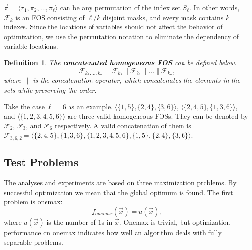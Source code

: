 \documentclass{sig-alternate}
\newtheorem{definition}{Definition}
\begin{document}
$\vec{\pi} = \langle\pi_1, \pi_2, \dots, \pi_\ell\rangle$ can be any permutation of the index set $S_\ell$.
In other words, ${\mathcal F}_k$ is an FOS consisting of $\ell/k$ disjoint masks, and every mask contains $k$ indexes.
Since the locations of variables should not affect the behavior of optimization,
we use the permutation notation to eliminate the dependency of variable locations.

\begin{definition}\label{def:catFOS}
The {\bf{concatenated homogeneous FOS}} can be defined below.
\begin{equation*}
{\mathcal F}_{k_1, \dots, k_a} = {\mathcal F}_{k_1} \parallel {\mathcal F}_{k_2} \parallel \dots \parallel {\mathcal F}_{k_a},
\end{equation*}
where $\parallel$ is the concatenation operator, which concatenates the elements in the sets while preserving the order.
\end{definition}

Take the case $\ell = 6$ as an example.
$\langle \{1, 5\}, \{2, 4\}, \{3, 6\}\rangle $, 
$\langle \{2, 4, 5\}, \{1, 3, 6\}\rangle $, and
$\langle \{1, 2, 3, 4, 5, 6\}\rangle $
are three valid homogeneous FOSs.
They can be denoted by ${\mathcal F}_2$, ${\mathcal F}_3$, and ${\mathcal F}_6$ respectively.
A valid concatenation of them is
${\mathcal F}_{3,6,2}=\langle \{2,4,5\},\{1,3,6\},\{1,2,3,4,5,6\},\{1,5\},\{2,4\},\{3,6\}\rangle $.

\subsection{Test Problems}
The analyses and experiments are based on three maximization problems.
By successful optimization we mean that the global optimum is found.
The first problem is onemax:
\begin{equation*}
f_{onemax}\left({\vec{x}}\right)=u\left({\vec x}\right),
\end{equation*}
where $u\left({\vec x}\right)$ is the number of $1$s in $\vec x$.
Onemax is trivial, but optimization performance on onemax
indicates how well an algorithm deals with fully separable problems.
\end{document}
